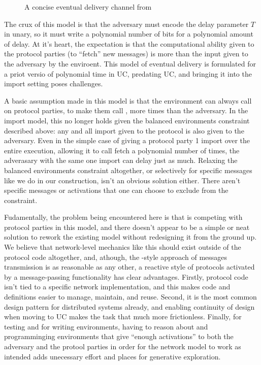 \begin{figure}

\caption{A concise eventual delivery channel from \cite{katzuc}}
\label{fig:fchanpoll}
\end{figure}

The crux of this model is that the adversary must encode the delay parameter $T$ in unary, so it must write a polynomial number of bits for a polynomial amount of delay.
At it's heart, the expectation is that the computational ability given to the protocol parties (to ``fetch'' new messages) is more than the input given to the adversary by the enviroent. 
This model of eventual delivery is formulated for a priot versio of polynomial time in UC, predating UC, and bringing it into the import setting poses challenges.

A basic assumption made in this model is that the environment can always call on protocol parties, to make them call , more times than the adversary. 
In the import model, this no longer holds given the balanced environments constraint described above: any and all import given to the protocol is also given to the adversary.
Even in the simple case of \Z giving a protocol party 1 import over the entire execution, allowing it to call fetch a polynomial number of times, the adverasary with the same one import can delay just as much.
Relaxing the balanced environments constraint altogether, or selectively for specific messages like we do in our construction, isn't an obvious solution either.
There aren't specific messages or activations that one can choose to exclude from the constraint. 


Fudamentally, the problem being encountered here is that \A is competing with protocol parties in this model, and there doesn't appear to be a simple or neat solution to rework the existing model without redesigning it from the ground up.
We believe that network-level mechanics like this should exist outside of the protocol code altogether, and, athough, the -style approach of messages transmission is as reasonable as any other, a reactive style of protocols activated by a message-passing functionality has clear advantages.
Firstly, protocol code isn't tied to a specific network implementation, and this makes code and definitions easier to manage, maintain, and reuse.
Second, it is the most common design pattern for distributed systems already, and enabling continuity of design when moving to UC makes the task that much more frictionless.
Finally, for testing and for writing environments, having to reason about and programminging environments that give ``enough activations'' to both the adversary and the protool parties in order for the network model to work as intended adds unecessary effort and places for generative exploration.

